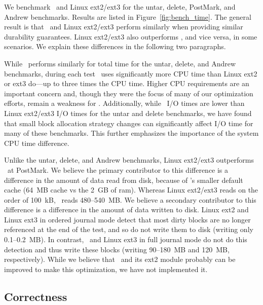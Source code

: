 We benchmark \Kudos\ and Linux ext2/ext3 for the untar, delete,
PostMark, and Andrew benchmarks. Results are listed in
Figure~\ref{fig:bench_time}.
%
The general result is that \Kudos\ and Linux ext2/ext3 perform
similarly when providing similar durability guarantees. Linux
ext2/ext3 also outperforms \Kudos, and vice versa, in some scenarios.
We explain these differences in the following two paragraphs.

\benchtable{}

While \Kudos\ performs similarly for total time for the untar, delete,
and Andrew benchmarks, during each test \Kudos\ uses significantly
more CPU time than Linux ext2 or ext3 do---up to three times the CPU
time.
%
Higher CPU requirements are an important concern and, though they were
the focus of many of our optimization efforts, remain a weakness
for \Kudos.
%
Additionally, while \Kudos\ I/O times are lower than Linux ext2/ext3 I/O
times for the untar and delete benchmarks, we have found that small
block allocation strategy changes can significantly affect I/O time
for many of these benchmarks. This further emphasizes the importance
of the system CPU time difference.

Unlike the untar, delete, and Andrew benchmarks, Linux ext2/ext3
outperforms \Kudos\ at PostMark.
%
We believe the primary contributor to this difference is a difference
in the amount of data read from disk, because of \Kudos's smaller
default cache (64~MB cache vs the 2~GB of ram).  Whereas
Linux ext2/ext3 reads on the order of 100~kB, \Kudos\ reads
480--540~MB. 
%
We believe a secondary contributor to this difference is a difference
in the amount of data written to disk. Linux ext2 and Linux ext3 in
ordered journal mode detect that most dirty blocks are no longer
referenced at the end of the test, and so do not write them to disk
(writing only 0.1--0.2~MB). In contrast, \Kudos\ and Linux ext3 in
full journal mode do not do this detection and thus write these blocks
(writing 90--180~MB and 120~MB, respectively). 
%
While we believe that \Kudos\ and its ext2 module probably can be
improved to make this optimization, we have not implemented it.


\subsection {Correctness}
\label{sec:eval:correctness}

